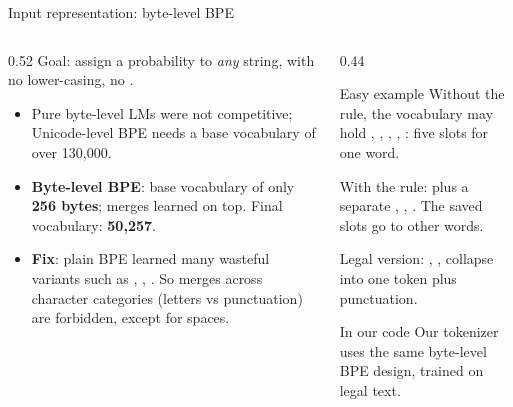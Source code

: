 \documentclass[aspectratio=169,11pt]{beamer}
\begin{document}
\begin{frame}{Input representation: byte-level BPE}
  \begin{columns}[T]
    \begin{column}{0.52\textwidth}
      \small
      Goal: assign a probability to \emph{any} string, with no lower-casing, no .
      \begin{itemize}
        \item Pure byte-level LMs were not competitive; Unicode-level BPE needs a base vocabulary of over 130,000.
        \item \textbf{Byte-level BPE}: base vocabulary of only \textbf{256 bytes}; merges learned on top. Final vocabulary: \textbf{50,257}.
        \item \textbf{Fix}: plain BPE learned many wasteful variants such as , , . So merges across character categories (letters vs punctuation) are forbidden, except for spaces.
      \end{itemize}
    \end{column}
    \begin{column}{0.44\textwidth}
      \begin{exampleblock}{Easy example}
        \small
        Without the rule, the vocabulary may hold , , , , : five slots for one word.
        \vspace{1mm}

        With the rule:  plus a separate , \code{!}, . The saved slots go to other words.
        \vspace{1mm}

        Legal version: , ,  collapse into one token  plus punctuation.
      \end{exampleblock}
      \begin{block}{In our code}
        \small
        Our tokenizer uses the same byte-level BPE design, trained on legal text.
      \end{block}
    \end{column}
  \end{columns}
\end{frame}
\end{document}
